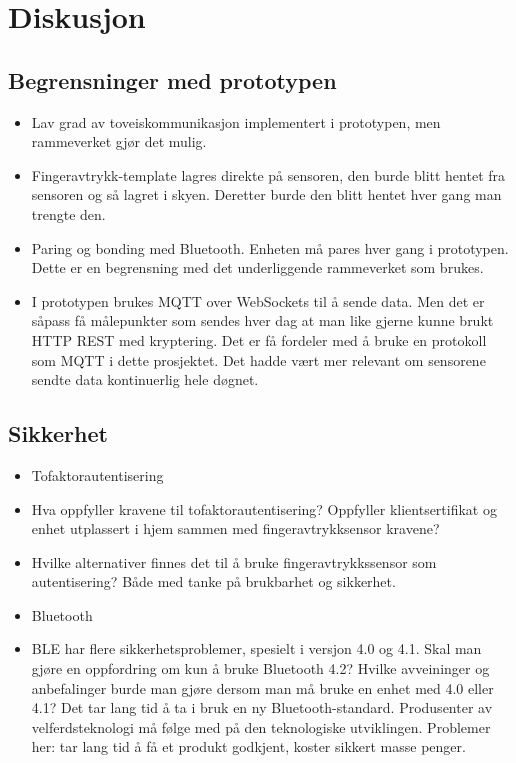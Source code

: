 \chapter{Diskusjon}
\label{ch:discussion}

\section{Begrensninger med
prototypen}\label{begrensninger-med-prototypen}

\begin{itemize}
\tightlist
\item
  Lav grad av toveiskommunikasjon implementert i prototypen, men rammeverket gjør det mulig.
\item
  Fingeravtrykk-template lagres direkte på sensoren, den burde blitt
  hentet fra sensoren og så lagret i skyen. Deretter burde den blitt
  hentet hver gang man trengte den.
\item
  Paring og bonding med Bluetooth. Enheten må pares hver gang i
  prototypen. Dette er en begrensning med det underliggende rammeverket
  som brukes.
\item
  I prototypen brukes MQTT over WebSockets til å sende data. Men det er
  såpass få målepunkter som sendes hver dag at man like gjerne kunne
  brukt HTTP REST med kryptering. Det er få fordeler med å bruke en
  protokoll som MQTT i dette prosjektet. Det hadde vært mer relevant om
  sensorene sendte data kontinuerlig hele døgnet.
\end{itemize}

\section{Sikkerhet}\label{sikkerhet}

\begin{itemize}
\tightlist
\item
  Tofaktorautentisering
\item
  Hva oppfyller kravene til tofaktorautentisering? Oppfyller
  klientsertifikat og enhet utplassert i hjem sammen med
  fingeravtrykksensor kravene?
\item
  Hvilke alternativer finnes det til å bruke fingeravtrykkssensor som
  autentisering? Både med tanke på brukbarhet og sikkerhet.
\item
  Bluetooth
\item
  BLE har flere sikkerhetsproblemer, spesielt i versjon 4.0 og 4.1. Skal
  man gjøre en oppfordring om kun å bruke Bluetooth 4.2? Hvilke
  avveininger og anbefalinger burde man gjøre dersom man må bruke en
  enhet med 4.0 eller 4.1? Det tar lang tid å ta i bruk en ny
  Bluetooth-standard. Produsenter av velferdsteknologi må følge med på
  den teknologiske utviklingen. Problemer her: tar lang tid å få et
  produkt godkjent, koster sikkert masse penger.
\end{itemize}


